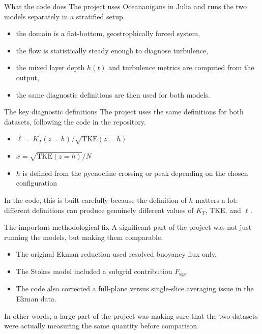 \documentclass[11pt]{beamer}
\begin{document}
\begin{frame}{What the code does}
    The project uses Oceananigans in Julia and runs the two models separately in a stratified setup.

    \begin{itemize}
        \item the domain is a flat-bottom, geostrophically forced system,
        \item the flow is statistically steady enough to diagnose turbulence,
        \item the mixed layer depth $h(t)$ and turbulence metrics are computed from the output,
        \item the same diagnostic definitions are then used for both models.
    \end{itemize}
\end{frame}

\begin{frame}{The key diagnostic definitions}
    The project uses the same definitions for both datasets, following the code in the repository.

    \begin{itemize}
        \item $\ell = K_T(z=h) / \sqrt{\mathrm{TKE}(z=h)}$
        \item $x = \sqrt{\mathrm{TKE}(z=h)} / N$
        \item $h$ is defined from the pycnocline crossing or peak depending on the chosen configuration
    \end{itemize}

    In the code, this is built carefully because the definition of $h$ matters a lot: different definitions can produce genuinely different values of $K_T$, TKE, and $\ell$.
\end{frame}

\begin{frame}{The important methodological fix}
    A significant part of the project was not just running the models, but making them comparable.

    \begin{itemize}
        \item The original Ekman reduction used resolved buoyancy flux only.
        \item The Stokes model included a subgrid contribution $F_{\mathrm{sgs}}$.
        \item The code also corrected a full-plane versus single-slice averaging issue in the Ekman data.
    \end{itemize}

    In other words, a large part of the project was making sure that the two datasets were actually measuring the same quantity before comparison.
\end{frame}
\end{document}
